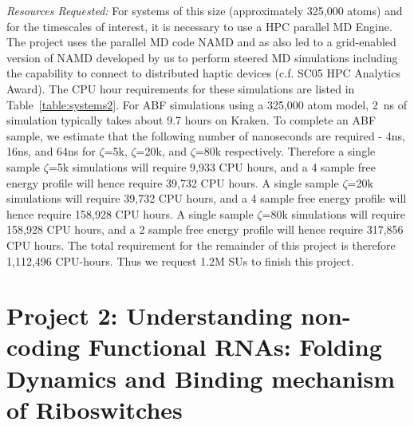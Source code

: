 \documentclass[a4paper,10pt]{article}
\newcommand{\up}{\vspace*{-1em}}
\begin{document}
{\it Resources Requested: } For systems of this size (approximately 325,000 atoms) and for the timescales of interest, it is necessary to use a HPC parallel MD Engine.  The project uses the parallel MD code NAMD and as also led to a grid-enabled version of NAMD developed by us to perform steered MD simulations including the capability to connect to distributed haptic devices (c.f. SC05 HPC Analytics Award). %
The CPU hour requirements for these simulations are listed in Table~\ref{table:systems2}. For ABF simulations using a 325,000 atom model, 2~ns of simulation typically takes about 9.7 hours on Kraken. To complete an ABF sample, we estimate that the following number of nanoseconds are required - 4ns, 16ns, and 64ns for $\zeta$=5k, $\zeta$=20k, and $\zeta$=80k respectively. Therefore a single sample $\zeta$=5k simulations will require 9,933 CPU hours, and a 4 sample free energy profile will hence require 39,732 CPU hours. A single sample $\zeta$=20k simulations will require 39,732 CPU hours, and a 4 sample free energy profile will hence require 158,928 CPU hours. A single sample $\zeta$=80k simulations will require 158,928 CPU hours, and a 2 sample free energy profile will hence require 317,856 CPU hours. The total requirement for the remainder of this project is therefore 1,112,496 CPU-hours. Thus we request 1.2M SUs to finish this project.


\up\up
\section*{Project 2: Understanding non-coding Functional RNAs: Folding Dynamics and Binding mechanism of Riboswitches}
\up
\end{document}
